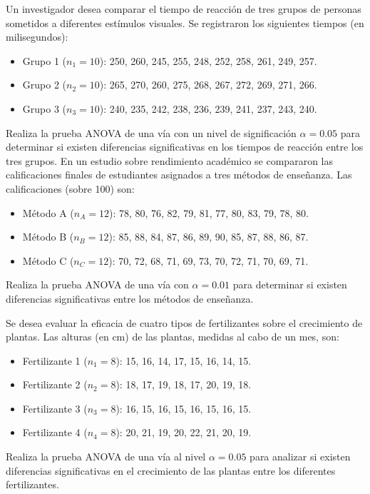 \documentclass[addpoints,12pt]{exam}
\theoremstyle{plain}
\theoremstyle{remark}
\theoremstyle{definition}
\begin{document}
\begin{questions}
 \question  Un investigador desea comparar el tiempo de reacción de tres grupos de personas sometidos a diferentes estímulos visuales. Se registraron los siguientes tiempos (en milisegundos):
    \begin{itemize}
        \item Grupo 1 (\(n_1 = 10\)): 250, 260, 245, 255, 248, 252, 258, 261, 249, 257.
        \item Grupo 2 (\(n_2 = 10\)): 265, 270, 260, 275, 268, 267, 272, 269, 271, 266.
        \item Grupo 3 (\(n_3 = 10\)): 240, 235, 242, 238, 236, 239, 241, 237, 243, 240.
    \end{itemize}
    Realiza la prueba ANOVA de una vía con un nivel de significación \(\alpha = 0.05\) para determinar si existen diferencias significativas en los tiempos de reacción entre los tres grupos.
 \question En un estudio sobre rendimiento académico se compararon las calificaciones finales de estudiantes asignados a tres métodos de enseñanza. Las calificaciones (sobre 100) son:
    \begin{itemize}
        \item Método A (\(n_A = 12\)): 78, 80, 76, 82, 79, 81, 77, 80, 83, 79, 78, 80.
        \item Método B (\(n_B = 12\)): 85, 88, 84, 87, 86, 89, 90, 85, 87, 88, 86, 87.
        \item Método C (\(n_C = 12\)): 70, 72, 68, 71, 69, 73, 70, 72, 71, 70, 69, 71.
    \end{itemize}
    Realiza la prueba ANOVA de una vía con \(\alpha = 0.01\) para determinar si existen diferencias significativas entre los métodos de enseñanza.
    
  \question  Se desea evaluar la eficacia de cuatro tipos de fertilizantes sobre el crecimiento de plantas. Las alturas (en cm) de las plantas, medidas al cabo de un mes, son:
    \begin{itemize}
        \item Fertilizante 1 (\(n_1 = 8\)): 15, 16, 14, 17, 15, 16, 14, 15.
        \item Fertilizante 2 (\(n_2 = 8\)): 18, 17, 19, 18, 17, 20, 19, 18.
        \item Fertilizante 3 (\(n_3 = 8\)): 16, 15, 16, 15, 16, 15, 16, 15.
        \item Fertilizante 4 (\(n_4 = 8\)): 20, 21, 19, 20, 22, 21, 20, 19.
    \end{itemize}
    Realiza la prueba ANOVA de una vía al nivel \(\alpha = 0.05\) para analizar si existen diferencias significativas en el crecimiento de las plantas entre los diferentes fertilizantes.
    

\end{questions}
\end{document}
